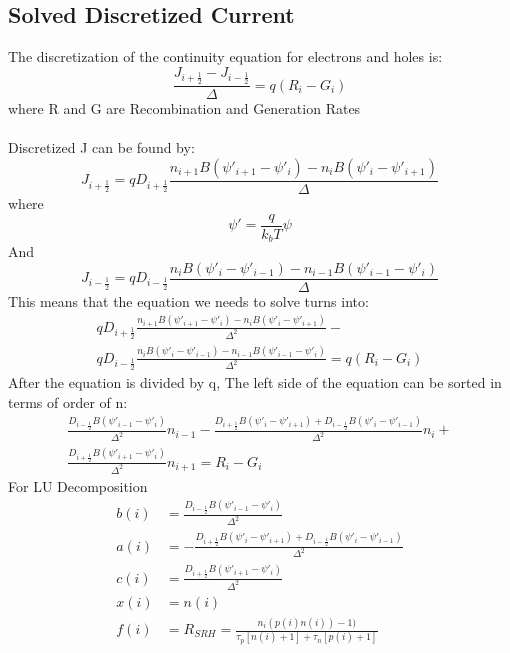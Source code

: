 \documentclass[12pt]{article}
\begin{document}
\subsection{Solved Discretized Current}
The discretization of the continuity equation for electrons and holes is:
\begin{equation}
\frac{J_{i+\frac{1}{2}}-J_{i-\frac{1}{2}}}{\Delta}=q(R_{i}-G_{i})
\end{equation}
where R and G are Recombination and Generation Rates
\\
\\
Discretized J can be found by:
\begin{equation}
J_{i+\frac{1}{2}}=
q D_{i+\frac{1}{2}}
\frac
{n_{i+1}B(\psi'_{i+1}-\psi'_{i})-n_{i}B(\psi'_{i}-\psi'_{i+1})}
{\Delta}
\label{eqn:DiscCurrentElecEq}
\end{equation}
where
\begin{equation}
\psi'=\frac{q}{k_{b} T}\psi
\end{equation}
And
\begin{equation}
J_{i-\frac{1}{2}}=
q D_{i-\frac{1}{2}}
\frac
{n_{i}B(\psi'_{i}-\psi'_{i-1})-n_{i-1}B(\psi'_{i-1}-\psi'_{i})}
{\Delta}
\label{eqn:DiscCurrentHoleEq}
\end{equation}
This means that the equation we needs to solve turns into:
\begin{multline}
q D_{i+\frac{1}{2}}
\frac
{n_{i+1}B(\psi'_{i+1}-\psi'_{i})-n_{i}B(\psi'_{i}-\psi'_{i+1})}
{\Delta^{2}}-
\\
q D_{i-\frac{1}{2}}
\frac
{n_{i}B(\psi'_{i}-\psi'_{i-1})-n_{i-1}B(\psi'_{i-1}-\psi'_{i})}
{\Delta^{2}}=
q(R_{i}-G_{i})
\end{multline}
After the equation is divided by q, The left side of the equation can be sorted in terms of order of n:
\begin{multline}
\frac{D_{i-\frac{1}{2}}B(\psi'_{i-1}-\psi'_{i})}{{\Delta^{2}}}n_{i-1}-
\frac{D_{i+\frac{1}{2}}B(\psi'_{i}-\psi'_{i+1})+D_{i-\frac{1}{2}}B(\psi'_{i}-\psi'_{i-1})}{{\Delta^{2}}}n_{i}+
\\
\frac{D_{i+\frac{1}{2}}B(\psi'_{i+1}-\psi'_{i})}{{\Delta^{2}}}n_{i+1}
=R_{i}-G_{i}
\end{multline}
For LU Decomposition
\begin{align}
b(i)&=\frac{D_{i-\frac{1}{2}}B(\psi'_{i-1}-\psi'_{i})}{{\Delta^{2}}}
\\
a(i)&=-\frac{D_{i+\frac{1}{2}}B(\psi'_{i}-\psi'_{i+1})+D_{i-\frac{1}{2}}B(\psi'_{i}-\psi'_{i-1})}{{\Delta^{2}}}
\\
c(i)&=\frac{D_{i+\frac{1}{2}}B(\psi'_{i+1}-\psi'_{i})}{{\Delta^{2}}}
\\
x(i)&=n(i)
\\
f(i)&=R_{SRH}=
\frac
{n_{i}(p(i)n(i))-1)}
{\tau_{p}[n(i)+1]+
	\tau_{n}[p(i)+1]}
\end{align}
\end{document}
